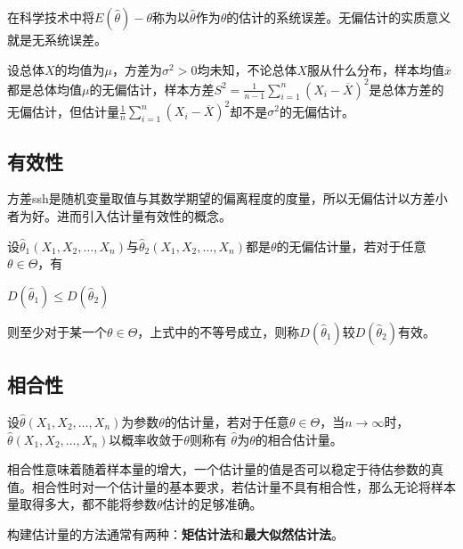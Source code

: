 \documentclass[11pt]{book}
\newcounter{#2}
\newcounter{#2}[#1]
\numberwithin{#2}{#1}
\begin{document}
在科学技术中将$E(\hat{\theta})-\theta$称为以$\hat{\theta}$作为$\theta$的估计的系统误差。无偏估计的实质意义就是无系统误差。

设总体$X$的均值为$\mu $，方差为$\sigma^2>0$均未知，不论总体$X$服从什么分布，样本均值$\overline{x}$都是总体均值$\mu $的无偏估计，样本方差$ S^2 =\frac{1}{n-1}\sum\limits_{i=1}^{n}(X_i-\overline{X})^2$是总体方差的无偏估计，但估计量$ \frac{1}{n}\sum\limits_{i=1}^{n}(X_i-\overline{X})^2$却不是$\sigma^2$的无偏估计。
\subsection{有效性}
方差ssh是随机变量取值与其数学期望的偏离程度的度量，所以无偏估计以方差小者为好。进而引入估计量有效性的概念。
\begin{newdef}
	设$\hat{\theta}_1(X_1,X_2,\dots,X_n)$与$\hat{\theta}_2(X_1,X_2,\dots,X_n)$都是$\theta$的无偏估计量，若对于任意$\theta\in\Theta$，有
	\begin{center}
		$D(\hat{\theta}_1) \le D(\hat{\theta}_2)$
	\end{center}
	则至少对于某一个$\theta\in\Theta$，上式中的不等号成立，则称$D(\hat{\theta}_1)$较$D(\hat{\theta}_2)$有效。
\end{newdef}
\subsection{相合性}
\begin{newdef}
	设$\hat{\theta}(X_1,X_2,\dots,X_n)$为参数$\theta$的估计量，若对于任意$\theta\in\Theta$，当$n\to\infty$时，$\hat{\theta}(X_1,X_2,\dots,X_n)$以概率收敛于$\theta$则称有
	$\hat{\theta}$为$\theta$的相合估计量。
\end{newdef}
相合性意味着随着样本量的增大，一个估计量的值是否可以稳定于待估参数的真值。相合性时对一个估计量的基本要求，若估计量不具有相合性，那么无论将样本量取得多大，都不能将参数$\theta$估计的足够准确。
	
	构建估计量的方法通常有两种：\textbf{矩估计法}和\textbf{最大似然估计法}。
	
\end{document}

